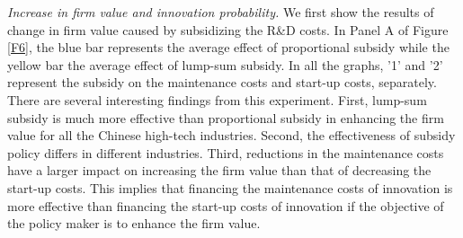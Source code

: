 \documentclass[11pt]{article}
\begin{document}
\textit{Increase in firm value and innovation probability.} We first show the results of change in firm value caused by subsidizing the R\&D costs. In Panel A of Figure \ref{F6}, the blue bar represents the average effect of proportional subsidy while the yellow bar the average effect of lump-sum subsidy. In all the graphs, '1' and '2' represent the subsidy on the maintenance costs and start-up costs, separately. There are several interesting findings from this experiment. First, lump-sum subsidy is much more effective than proportional subsidy in enhancing the firm value for all the Chinese high-tech industries. Second, the effectiveness of subsidy policy differs in different industries. Third, reductions in the maintenance costs have a larger impact on increasing the firm value than that of decreasing the start-up costs. This implies that financing the maintenance costs of innovation is more effective than financing the start-up costs of innovation if the objective of the policy maker is to enhance the firm value. 
\end{document}
